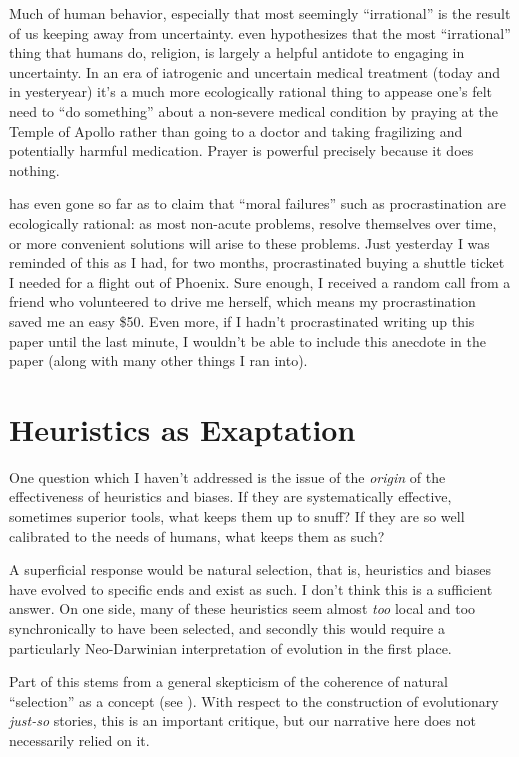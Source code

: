 \documentclass{article}
\begin{document}
Much of human behavior, especially that most seemingly ``irrational'' is the result of us keeping away from uncertainty.
\textcite{taleb12} even hypothesizes that the most ``irrational'' thing that humans do, religion, is largely a helpful antidote to engaging in uncertainty.
In an era of iatrogenic and uncertain medical treatment (today and in yesteryear) it's a much more ecologically rational thing to appease one's felt need to ``do something'' about a non-severe medical condition by praying at the Temple of Apollo rather than going to a doctor and taking fragilizing and potentially harmful medication.
Prayer is powerful precisely because it does nothing.


\textcite{taleb15} has even gone so far as to claim that ``moral failures'' such as procrastination are ecologically rational: as most non-acute problems, resolve themselves over time, or more convenient solutions will arise to these problems.
Just yesterday I was reminded of this as I had, for two months, procrastinated buying a shuttle ticket I needed for a flight out of Phoenix.
Sure enough, I received a random call from a friend who volunteered to drive me herself, which means my procrastination saved me an easy \$50.
Even more, if I hadn't procrastinated writing up this paper until the last minute, I wouldn't be able to include this anecdote in the paper (along with many other things I ran into).


\section{Heuristics as Exaptation}


One question which I haven't addressed is the issue of the \emph{origin} of the effectiveness of heuristics and biases.
If they are systematically effective, sometimes superior tools, what keeps them up to snuff?
If they are so well calibrated to the needs of humans, what keeps them as such?

A superficial response would be natural selection, that is, heuristics and biases have evolved to specific ends and exist as such.
I don't think this is a sufficient answer.
On one side, many of these heuristics seem almost \emph{too} local and too synchronically to have been selected, and secondly this would require a particularly Neo-Darwinian interpretation of evolution in the first place.

Part of this stems from a general skepticism of the coherence of natural ``selection'' as a concept (see \textcite{fodor10}).
With respect to the construction of evolutionary \textit{just-so} stories, this is an important critique, but our narrative here does not necessarily relied on it.
\end{document}
